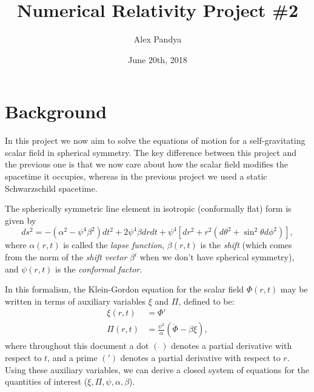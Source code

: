 \documentclass[12pt]{article}
\numberwithin{equation}{section}
\begin{document}
	\title{Numerical Relativity Project \#2}
	\author{Alex Pandya}
	\date{June 20th, 2018}
	\maketitle

\section{Background}
In this project we now aim to solve the equations of motion for a self-gravitating scalar field in spherical symmetry.  The key difference between this project and the previous one is that we now care about how the scalar field modifies the spacetime it occupies, whereas in the previous project we used a static Schwarzschild spacetime.

The spherically symmetric line element in isotropic (conformally flat) form is given by
\begin{equation} \label{eq:line_element}
ds^2 = -(\alpha^2 - \psi^4 \beta^2) dt^2 + 2 \psi^4 \beta dr dt + \psi^4 [dr^2 + r^2 (d\theta^2 + \sin^2 \theta d\phi^2)],
\end{equation}
where $\alpha(r, t)$ is called the \textit{lapse function}, $\beta(r, t)$ is the \textit{shift} (which comes from the norm of the \textit{shift vector} $\beta^i$ when we don't have spherical symmetry), and $\psi(r, t)$ is the \textit{conformal factor}.

In this formalism, the Klein-Gordon equation for the scalar field $\Phi(r, t)$ may be written in terms of auxiliary variables $\xi$ and $\Pi$, defined to be:
\begin{align}
\xi(r, t) &= \Phi' \label{eq:xi_defn} \\
\Pi(r, t) &= \frac{\psi^2}{\alpha}(\dot{\Phi} - \beta \xi), \label{eq:Pi_defn} 
\end{align}
where throughout this document a dot $(\dot{~})$ denotes a partial derivative with respect to $t$, and a prime $(')$ denotes a partial derivative with respect to $r$.  Using these auxiliary variables, we can derive a closed system of equations for the quantities of interest ($\xi, \Pi, \psi, \alpha, \beta$).
\end{document}
